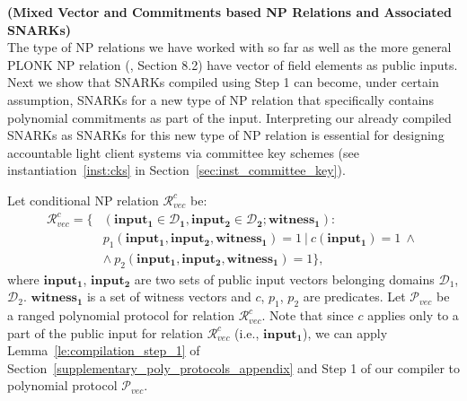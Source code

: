 \noindent \textbf{(Mixed Vector and Commitments based NP Relations and Associated SNARKs)} \\

\noindent The type of NP relations we have worked with so far as well as the more general PLONK NP relation 
(\cite{plonk}, Section 8.2) have vector of field elements as public inputs. Next we show that SNARKs 
compiled using Step 1 can become, under certain assumption, SNARKs for a new type of NP relation 
that specifically contains polynomial commitments as part of the input. Interpreting 
our already compiled SNARKs as SNARKs for this new type of NP relation is essential for designing 
accountable light client systems via committee key schemes (see instantiation~\ref{inst:cks} 
in Section~\ref{sec:inst_committee_key}).  

\noindent Let conditional NP relation $\mathcal{R}_{\mathit{vec}}^c$  be:
\begin{align*}
\mathcal{R}_{\mathit{vec}}^c = \{&(\mathbf{input_1} \in \mathbf{\mathcal{D}_1}, \mathbf{input_2} \in\mathbf{\mathcal{D}_2}; \mathbf{witness_1}): \\  
&p_1(\mathbf{input_1}, \mathbf{input_2}, \mathbf{witness_1}) = 1 \ | \ c(\mathbf{input_1}) = 1 \ \wedge\ \\
&\wedge \ p_2(\mathbf{input_1}, \mathbf{input_2}, \mathbf{witness_1}) = 1 \},
\end{align*}
\noindent where $\mathbf{input_1}$, $\mathbf{input_2}$ are two sets of public input vectors 
belonging domains  $\mathcal{D}_1$, $\mathcal{D}_2$. $\mathbf{witness_1}$ is a set of witness vectors and $c$, $p_1$, $p_2$ are predicates. 
Let $\mathscr{P}_{\mathit{vec}}$ be a ranged polynomial protocol for relation $\mathcal{R}_{\mathit{vec}}^c$. Note that since $c$ applies 
only to a part of the public input for relation $\mathcal{R}_{\mathit{vec}}^c$ 
(i.e., $\mathbf{input_1}$), we can apply Lemma~\ref{le:compilation_step_1} of Section~\ref{supplementary_poly_protocols_appendix} and Step 1 
of our compiler to polynomial protocol $\mathscr{P}_{\mathit{vec}}$. \\

